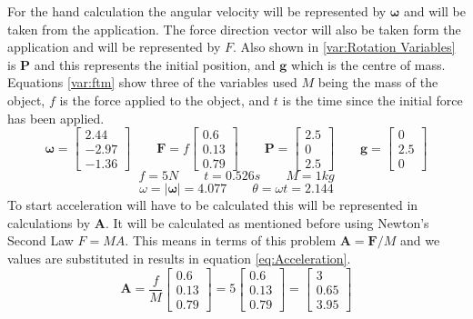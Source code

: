 For the hand calculation the angular velocity will be represented by $\boldsymbol{\omega}$ and will be taken from the application.
The force direction vector will also be taken form the application and will be represented by $F$.
Also shown in \ref{var:Rotation Variables} is $\mathbf{P}$ and this represents the initial position, and $\mathbf{g}$ which is the centre of mass.
Equations \ref{var:ftm} show three of the variables used $M$ being the mass of the object, $f$ is the force applied to the object, and $t$ is the time since the initial force has been applied. 
\begin{equation}\label{var:Rotation Variables}
	\boldsymbol{\omega} = 
	\begin{bmatrix}
		 2.44 \\
		-2.97 \\
		-1.36 
	\end{bmatrix}
	\qquad
	\mathbf{F} = f
	\begin{bmatrix}
		 0.6  \\
		 0.13 \\
		 0.79 
	\end{bmatrix}
	\qquad
	\mathbf{P}= 
	\begin{bmatrix}
		2.5 \\
		0 	 \\
		2.5 
	\end{bmatrix}
	\qquad
	\mathbf{g} = 
	\begin{bmatrix}
		0 \\
	 	2.5 	 \\
		0 
	\end{bmatrix}
\end{equation}
\begin{equation}\label{var:ftm}
	f = 5N
	\qquad
	t = 0.526s
	\qquad
	M = 1kg
\end{equation}
\begin{equation}\label{var:thetaomega}
	\omega = |\boldsymbol\omega| = 4.077
	\qquad
	\theta = \omega t = 2.144
\end{equation}
To start acceleration will have to be calculated this will be represented in calculations by $\mathbf{A}$.
It will be calculated as mentioned before using Newton’s Second Law $F=MA$.
This means in terms of this problem $\mathbf{A} = \mathbf{F}/M$ and we values are substituted in results in equation \ref{eq:Acceleration}.
\begin{equation}\label{eq:Acceleration}
	\mathbf{A} = \frac{f}{M}
	\begin{bmatrix}
		 0.6  \\
		 0.13 \\
		 0.79 
	\end{bmatrix} = 5
	\begin{bmatrix}
		 0.6  \\
		 0.13 \\
		 0.79 
	\end{bmatrix} = 
	\begin{bmatrix}
		 3  \\
		 0.65 \\
		 3.95 
	\end{bmatrix}
\end{equation}
